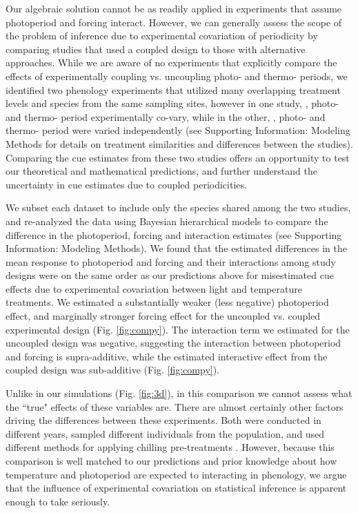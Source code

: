 \documentclass[11pt]{article}
\begin{document}
Our algebraic solution cannot be as readily applied in experiments that assume photoperiod and forcing interact. However, we can generally assess the scope of the problem of inference due to experimental covariation of periodicity by comparing studies that used a coupled design to those with alternative approaches. While we are aware of no experiments that explicitly compare the effects of experimentally coupling vs. uncoupling photo- and thermo- periods, we identified two phenology experiments that utilized many overlapping treatment levels and species from the same sampling sites, however in one study, \citet{Flynn2018}, photo- and thermo- period experimentally co-vary, while in the other, \citet{Buonaiuto:2021ug},  photo- and thermo- period were varied independently (see Supporting Information: Modeling Methods for details on treatment similarities and differences between the studies). Comparing the cue estimates from these two studies offers an opportunity to test our theoretical and mathematical predictions, and further understand the uncertainty in cue estimates due to coupled periodicities.

We subset each dataset to include only the species shared among the two studies, and re-analyzed the data using Bayesian hierarchical models to compare the difference in the photoperiod, forcing and interaction estimates (see Supporting Information: Modeling Methods). We found that the estimated differences in the mean response to photoperiod and forcing and their interactions among study designs were on the same order as our predictions above for misestimated cue effects due to experimental covariation between light and temperature treatments. We estimated a substantially weaker (less negative) photoperiod effect, and marginally stronger forcing effect for the uncoupled vs. coupled experimental design (Fig. \ref{fig:compy}). The interaction term we estimated for the uncoupled design was negative, suggesting the interaction between photoperiod and forcing is supra-additive, while the estimated interactive effect from the coupled design was sub-additive (Fig. \ref{fig:compy}).

Unlike in our simulations (Fig. \ref{fig:3d}), in this comparison we cannot assess what the ``true" effects of these variables are. There are almost certainly other factors driving the differences between these experiments. Both were conducted in different years, sampled different individuals from the population, and used different methods for applying chilling pre-treatments \citep{Flynn2018,Buonaiuto:2021ug}. However, because this comparison is well matched to our predictions and prior knowledge about how temperature and photoperiod are expected to interacting in phenology, we argue that the influence of experimental covariation on statistical inference is apparent enough to take seriously.\\
\end{document}
